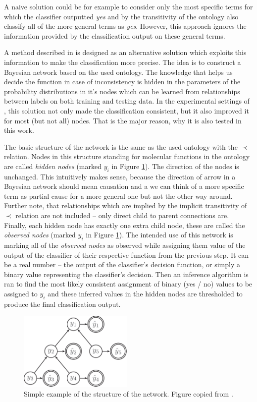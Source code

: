 \documentclass[11pt,twoside,a4paper]{book}
\begin{document}
A naive solution could be for example
to consider only the most specific terms
for which the classifier outputted \emph{yes}
and by the transitivity of the ontology also
classify all of the more general terms as \emph{yes}.
However, this approach ignores the information
provided by the classification output on these
general terms. 

A method described in \cite{bnet} is designed
as an alternative solution which exploits this
information to make the classification more precise.
The idea is to construct a Bayesian network based on
the used ontology.
The knowledge that helps us decide the function
in case of inconsistency
is hidden in the parameters of the probability 
distributions in it's nodes 
which can be learned from relationships between
labels on both training and testing data.
In the experimental settings of \cite{bnet},
this solution not only made the classification 
consistent,
but it also improved it for most (but not all) nodes.
That is the major reason, why it is also tested in this work.

The basic structure of the network is the same as the used ontology 
with the $\prec$ relation. 
Nodes in this structure standing for molecular functions
in the ontology are called \emph{hidden nodes} (marked $y_i$ in Figure \ref{fig:net}). 
The direction of the nodes is unchanged.
This intuitively makes sense,
because the direction of arrow in a Bayesian 
network should mean causation
and a we can think of a more specific term as partial cause
for a more general one but not the other way around.
Further note, that relationships which are implied by the implicit transitivity
of $\prec$ relation are not included -- only direct child to parent connections are.
Finally, each hidden node has exactly one extra child node, these
are called the \emph{observed nodes} (marked $\hat{y}_i$ in Figure \ref{fig:net}).
The intended use of this network
is marking all of the \emph{observed nodes} as observed
while assigning them value of the output 
of the classifier of their respective function from the previous step.
It can be a real number -- the output of the classifier's decision function,
or simply a binary value representing the classifier's decision.
Then an inference algorithm is ran
to find the most likely consistent assignment of binary (yes / no) values to be assigned to $y_i$
and these inferred values in the hidden nodes 
are thresholded to produce the final classification output.


\begin{figure}[h]
\begin{center}
\includegraphics[width=5.5cm]{figures/net}
\caption[Example of the structure of the Bayesian network]{Simple example of the structure of the network.
Figure copied from \cite{bnet}.}
\label{fig:net}
\end{center}
\end{figure}
\end{document}
